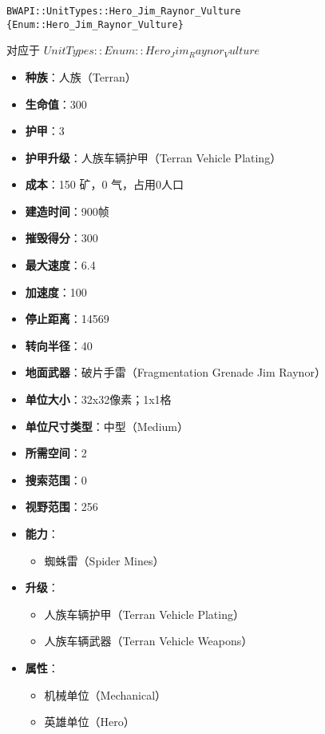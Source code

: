 \begin{tcolorbox}[colback=white, colframe=black!60!white, title=Hero\_Jim\_Raynor\_Vulture(), arc=0mm]
    \begin{verbatim}
BWAPI::UnitTypes::Hero_Jim_Raynor_Vulture {Enum::Hero_Jim_Raynor_Vulture}
    \end{verbatim}
    对应于  $ UnitTypes::Enum::Hero_Jim_Raynor_Vulture $ 
    \begin{itemize}
        \item \textbf{种族}：人族（Terran）
        \item \textbf{生命值}：300
        \item \textbf{护甲}：3
        \item \textbf{护甲升级}：人族车辆护甲（Terran Vehicle Plating）
        \item \textbf{成本}：150 矿，0 气，占用0人口
        \item \textbf{建造时间}：900帧
        \item \textbf{摧毁得分}：300
        \item \textbf{最大速度}：6.4
        \item \textbf{加速度}：100
        \item \textbf{停止距离}：14569
        \item \textbf{转向半径}：40
        \item \textbf{地面武器}：破片手雷（Fragmentation Grenade Jim Raynor）
        \item \textbf{单位大小}：32x32像素；1x1格
        \item \textbf{单位尺寸类型}：中型（Medium）
        \item \textbf{所需空间}：2
        \item \textbf{搜索范围}：0
        \item \textbf{视野范围}：256
        \item \textbf{能力}：
            \begin{itemize}
                \item 蜘蛛雷（Spider Mines）
            \end{itemize}
        \item \textbf{升级}：
            \begin{itemize}
                \item 人族车辆护甲（Terran Vehicle Plating）
                \item 人族车辆武器（Terran Vehicle Weapons）
            \end{itemize}
        \item \textbf{属性}：
            \begin{itemize}
                \item 机械单位（Mechanical）
                \item 英雄单位（Hero）
            \end{itemize}
    \end{itemize}
\end{tcolorbox}

